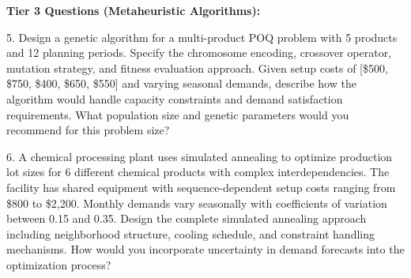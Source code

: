 \documentclass{article}
\begin{document}
\textbf{Tier 3 Questions (Metaheuristic Algorithms):}

5. Design a genetic algorithm for a multi-product POQ problem with 5 products and 12 planning periods. Specify the chromosome encoding, crossover operator, mutation strategy, and fitness evaluation approach. Given setup costs of [\$500, \$750, \$400, \$650, \$550] and varying seasonal demands, describe how the algorithm would handle capacity constraints and demand satisfaction requirements. What population size and genetic parameters would you recommend for this problem size?

6. A chemical processing plant uses simulated annealing to optimize production lot sizes for 6 different chemical products with complex interdependencies. The facility has shared equipment with sequence-dependent setup costs ranging from \$800 to \$2,200. Monthly demands vary seasonally with coefficients of variation between 0.15 and 0.35. Design the complete simulated annealing approach including neighborhood structure, cooling schedule, and constraint handling mechanisms. How would you incorporate uncertainty in demand forecasts into the optimization process?
\end{document}

